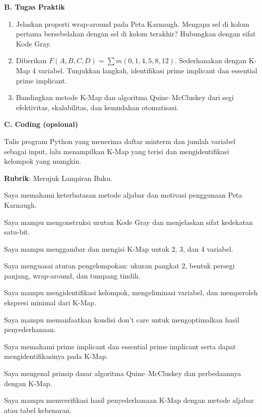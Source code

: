 \documentclass[../main]{subfiles}
\begin{document}
\begin{asesmen}
\textbf{B. Tugas Praktik}
\begin{enumerate}
  \item Jelaskan properti wrap-around pada Peta Karnaugh. Mengapa sel di kolom pertama bersebelahan dengan sel di kolom terakhir? Hubungkan dengan sifat Kode Gray.
  \item Diberikan $F(A,B,C,D) = \sum m(0, 1, 4, 5, 8, 12)$. Sederhanakan dengan K-Map 4 variabel. Tunjukkan langkah, identifikasi prime implicant dan essential prime implicant.
  \item Bandingkan metode K-Map dan algoritma Quine--McCluskey dari segi efektivitas, skalabilitas, dan kemudahan otomatisasi.
\end{enumerate}

\textbf{C. Coding (opsional)}

Tulis program Python yang menerima daftar minterm dan jumlah variabel sebagai input, lalu menampilkan K-Map yang terisi dan mengidentifikasi kelompok yang mungkin.

\textbf{Rubrik}: Merujuk Lampiran Buku.
\end{asesmen}


\begin{checklist}
  \item Saya memahami keterbatasan metode aljabar dan motivasi penggunaan Peta Karnaugh.
  \item Saya mampu mengonstruksi urutan Kode Gray dan menjelaskan sifat kedekatan satu-bit.
  \item Saya mampu menggambar dan mengisi K-Map untuk 2, 3, dan 4 variabel.
  \item Saya menguasai aturan pengelompokan: ukuran pangkat 2, bentuk persegi panjang, wrap-around, dan tumpang tindih.
  \item Saya mampu mengidentifikasi kelompok, mengeliminasi variabel, dan memperoleh ekspresi minimal dari K-Map.
  \item Saya mampu memanfaatkan kondisi don't care untuk mengoptimalkan hasil penyederhanaan.
  \item Saya memahami prime implicant dan essential prime implicant serta dapat mengidentifikasinya pada K-Map.
  \item Saya mengenal prinsip dasar algoritma Quine--McCluskey dan perbedaannya dengan K-Map.
  \item Saya mampu memverifikasi hasil penyederhanaan K-Map dengan metode aljabar atau tabel kebenaran.
\end{checklist}
\end{document}

